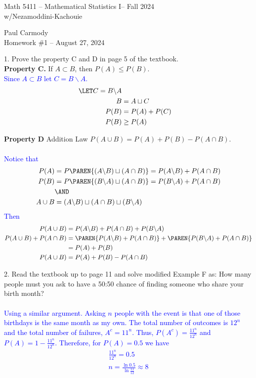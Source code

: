 \documentclass[10pt,a4paper]{report}
\newcommand{\CLASSNAME}{Math 5411 -- Mathematical Statistics I}
\newcommand{\PROFESSOR}{Nezamoddini-Kachouie}
\newcommand{\STUDENTNAME}{Paul Carmody}
\newcommand{\ASSIGNMENT}{Homework \#1 }
\newcommand{\DUEDATE}{August 27, 2024}
\newcommand{\SEMESTER}{Fall 2024}
\newcommand{\BLUE}[1]{\textcolor{blue}{#1}}
\begin{document}
\begin{center}
	\Large{\CLASSNAME -- \SEMESTER} \\
	\large{w/\PROFESSOR}
\end{center}
\begin{center}
	\STUDENTNAME \\
	\ASSIGNMENT -- \DUEDATE\\
\end{center}

1. Prove the property C and D in page 5 of the textbook. \\

\textbf{Property C.} If $A \subset B$, then $P(A) \le P(B)$.  \\
\BLUE{Since $A \subset B$ let $C = B\backslash A$.
\begin{align*}
	\LET C = B \backslash A\\
	B &= A \sqcup C\\
	P(B) &= P(A) + P(C)\\
	P(B) &\ge P(A)
\end{align*} }

\textbf{Property D} Addition Law $P(A \cup B) = P(A) + P(B)- P(A \cap B)$. \\ \\
\BLUE{ Notice that\begin{align*}
	P(A) &= P\PAREN{ (A\backslash B) \sqcup (A \cap B) } = P(A\backslash B)+P (A \cap B) \\
	P(B) &= P\PAREN{ (B\backslash A) \sqcup (A \cap B) } = P(B\backslash A)+P (A \cap B) \\ 
	&\AND \\
	A \cup B &= (A\backslash B) \sqcup (A \cap B) \sqcup (B \backslash A)
\end{align*}Then
\begin{align*}
	P(A \cup B) &= P(A\backslash B) +P (A \cap B) + P(B \backslash A) \\
		P(A \cup B) + P(A \cap B) &= \PAREN{ P(A\backslash B) +P (A \cap B)} + \PAREN{P(B \backslash A) + P(A \cap B)} \\
		&= P(A)+P(B) \\
	P(A \cup B) &= P(A) + P(B)- P(A \cap B)
\end{align*} }
\newpage

2. Read the textbook up to page 11 and solve modified Example F as: How many people must you ask to have a 50:50 chance of finding someone who share your birth month?\\
\\\BLUE{ Using a similar argument.  Asking $n$ people with the event is that one of those birthdays is the same month as my own.  The total number of outcomes is $12^n$ and the total number of failures, $A^c = 11^n$.  Thus, $P(A^c) = \frac{11^n}{12^n}$ and $P(A) = 1-\frac{11^n}{12^n}$.  Therefore, for $P(A) = 0.5$ we have 
\begin{align*}
	\frac{11^n}{12^n}=0.5\\
	n= \frac{\ln 0.5}{\ln \frac{11}{12} } \approx 8
\end{align*} }
\end{document}
